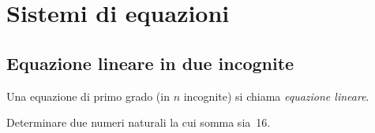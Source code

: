 \chapter{Sistemi di equazioni}
\section{Equazione lineare in due incognite}

\begin{definizione}
Una equazione di primo grado (in $n$ incognite) si chiama \emph{equazione lineare}.
\end{definizione}

\begin{problema}
Determinare due numeri naturali la cui somma sia~16.
\end{problema}

